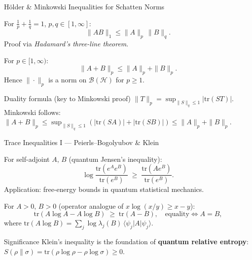 \documentclass{beamer}
\newcommand{\Hilb}{\mathcal{H}}
\newcommand{\Bound}{\mathcal{B}}
\newcommand{\tr}{\mathrm{tr}}
\newcommand{\ket}[1]{|#1\rangle}
\newcommand{\bra}[1]{\langle#1|}
\newcommand{\norm}[1]{\|#1\|}
\begin{document}
\begin{frame}[shrink=10]{H\"older \& Minkowski Inequalities for Schatten Norms}
  \small
  \begin{tcolorbox}[thmbox={H\"older's Inequality}, left=3pt, right=3pt, top=2pt, bottom=2pt]
    For $\tfrac{1}{p}+\tfrac{1}{q}=1$, $p,q\in[1,\infty]$:
    \[
      \norm{AB}_1 \le \norm{A}_p\,\norm{B}_q.
    \]
    Proof via \emph{Hadamard's three-line theorem}.
  \end{tcolorbox}

  \vspace{0.2em}
  \begin{tcolorbox}[thmbox={Minkowski's Inequality}, left=3pt, right=3pt, top=2pt, bottom=2pt]
    For $p\in[1,\infty)$:
    \[
      \norm{A+B}_p \le \norm{A}_p + \norm{B}_p.
    \]
    Hence $\norm{\cdot}_p$ is a norm on $\Bound(\Hilb)$ for $p\ge 1$.
  \end{tcolorbox}

  \vspace{0.2em}
  \begin{block}{Duality formula (key to Minkowski proof)}
    $\norm{T}_p = \sup_{\norm{S}_q\le 1}|\tr(ST)|.$\quad
    Minkowski follows:
    $\norm{A+B}_p \le \sup_{\norm{S}_q\le 1}(|\tr(SA)|+|\tr(SB)|)\le\norm{A}_p+\norm{B}_p$.
  \end{block}
\end{frame}

\begin{frame}[shrink=10]{Trace Inequalities I --- Peierls--Bogolyubov \& Klein}
  \small
  \begin{tcolorbox}[thmbox={Peierls--Bogolyubov Inequality}, left=3pt, right=3pt, top=2pt, bottom=2pt]
    For self-adjoint $A$, $B$ (quantum Jensen's inequality):
    \[
      \log\frac{\tr(e^A e^B)}{\tr(e^B)} \;\ge\; \frac{\tr(A e^B)}{\tr(e^B)}.
    \]
    Application: free-energy bounds in quantum statistical mechanics.
  \end{tcolorbox}

  \vspace{0.2em}
  \begin{tcolorbox}[thmbox={Klein's Inequality}, left=3pt, right=3pt, top=2pt, bottom=2pt]
    For $A>0$, $B>0$ (operator analogue of $x\log(x/y)\ge x-y$):
    \[
      \tr(A\log A - A\log B) \;\ge\; \tr(A-B), \quad\text{equality}\Leftrightarrow A=B,
    \]
    where $\tr(A\log B)=\sum_j\log\lambda_j(B)\,\bra{\psi_j}A\ket{\psi_j}$.
  \end{tcolorbox}

  \vspace{0.2em}
  \begin{alertblock}{Significance}
    Klein's inequality is the foundation of \textbf{quantum relative entropy}:
    $S(\rho\|\sigma)=\tr(\rho\log\rho-\rho\log\sigma)\ge 0$.
  \end{alertblock}
\end{frame}
\end{document}
